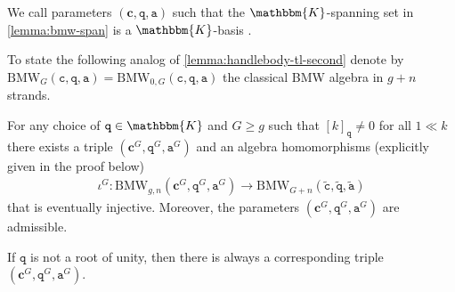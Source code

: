 \documentclass[a4paper,11pt]{amsart}
\let\emph\relax
\newcommand{\setstuff}[1]{\mathrm{#1}}
\newcommand{\KK}{\mathbbm{K}}
\newcommand{\bsym}[1]{\boldsymbol{#1}}
\newcommand{\varsym}[1]{\mathtt{#1}}
\newcommand{\qvar}{\varsym{q}}
\newcommand{\cpar}{\bsym{c}}
\newcommand{\cvar}{\varsym{c}}
\newcommand{\avar}{\varsym{a}}
\numberwithin{equation}{section}
\let\fullref\autoref
\begin{document}
\begin{definition}
We call parameters $(\cpar,\qvar,\avar)$ such that the $\KK$-spanning set 
in \fullref{lemma:bmw-span} is a $\KK$-basis
\emph{admissible}.
\end{definition}

To state the following analog of \fullref{lemma:handlebody-tl-second} denote by $\setstuff{BMW}_{G}(\cvar,\qvar,\avar)
=\setstuff{BMW}_{0,G}(\cvar,\qvar,\avar)$ 
the classical BMW algebra in $g+n$ strands. 

\begin{lemma}\label{lemma:handlebody-bmw-second}
For any choice of $\qvar\in\KK$ and $G\geq g$ such that 
$[k]_{\qvar}\neq 0$ 
for all $1\ll k$ there exists 
a triple $(\cpar^{G},\qvar^{G},\avar^{G})$ and 
an algebra homomorphisms 
(explicitly given in the proof below)
\begin{gather*}
\iota^{G}\colon\setstuff{BMW}_{g,n}(\cpar^{G},\qvar^{G},\avar^{G})
\to\setstuff{BMW}_{G+n}(\tilde{\cvar},\tilde{\qvar},\tilde{\avar})
\end{gather*}
that is eventually injective.
Moreover, the parameters $(\cpar^{G},\qvar^{G},\avar^{G})$ are admissible.
\end{lemma}

If $\qvar$ is not a root of unity, then there is 
always a corresponding triple $(\cpar^{G},\qvar^{G},\avar^{G})$.
\end{document}
